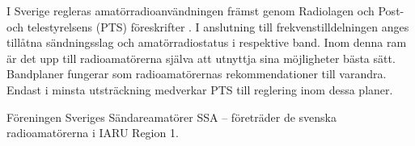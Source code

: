 I Sverige regleras amatörradioanvändningen främst genom Radiolagen och Post- och
telestyrelsens (PTS) föreskrifter \cite{PTSFS2015:4}. I anslutning till
frekvenstilldelningen anges tillåtna sändningsslag och amatörradiostatus
i respektive band. Inom denna ram
är det upp till radioamatörerna själva att utnyttja sina möjligheter bästa sätt.
Bandplaner fungerar som radioamatörernas rekommendationer till varandra. Endast
i minsta utsträckning medverkar PTS till reglering inom dessa planer.



Föreningen Sveriges Sändareamatörer SSA -- företräder de svenska
radioamatörerna i IARU Region 1.
